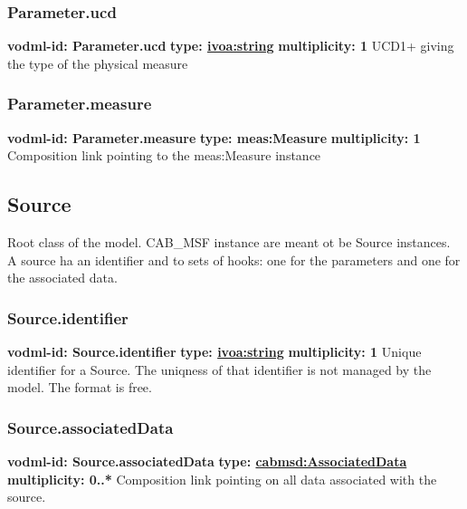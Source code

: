     \subsubsection{Parameter.ucd}
      \textbf{vodml-id: Parameter.ucd} \newline
      \textbf{type: \hyperref[sect:ivoa]{ivoa:string}} \newline
      \textbf{multiplicity: 1} \newline 
      UCD1+ giving the type of the physical measure

    \subsubsection{Parameter.measure}
      \textbf{vodml-id: Parameter.measure} \newline
      \textbf{type: meas:Measure} \newline
      \textbf{multiplicity: 1} \newline 
      Composition link pointing to the meas:Measure instance

  \subsection{Source}
  \label{sect:Source}
    Root class of the model. CAB\_MSF instance are meant ot be Source instances. A source ha an identifier and to sets of hooks: one for the parameters and one for the associated data.

    \subsubsection{Source.identifier}
      \textbf{vodml-id: Source.identifier} \newline
      \textbf{type: \hyperref[sect:ivoa]{ivoa:string}} \newline
      \textbf{multiplicity: 1} \newline 
      Unique identifier for a Source. The uniqness of that identifier is not managed by the model. The format is free.

    \subsubsection{Source.associatedData}
      \textbf{vodml-id: Source.associatedData} \newline
      \textbf{type: \hyperref[sect:AssociatedData]{cabmsd:AssociatedData}} \newline
      \textbf{multiplicity: 0..*} \newline 
      Composition link pointing on all data associated with the source.


